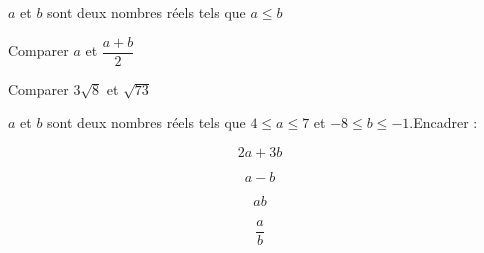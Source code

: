 \documentclass[a4paper,12pt]{article}
\begin{document}
\devoir[prv=true,ds=true,num=2 ,niv=3 , date=15/12/2022 ]
\begin{exo}[3]
$a$ et $b$ sont deux nombres réels tels que $a\leq b$
\begin{enumerate}

\begin{minipage}{.5\linewidth}
\item Comparer $a$ et $\dfrac{a+b}{2}$ 
\end{minipage}%
\begin{minipage}{.5\linewidth}
\item Comparer $3\sqrt{8}$ et $\sqrt{73}$ 
\end{minipage}
\end{enumerate}
\begin{minipage}{.49\linewidth}
\anserline[5]
\end{minipage}
\hfill\vline\hfill
\begin{minipage}{.49\linewidth}
\anserline[5]
\end{minipage}
\end{exo}

\begin{exo}[8]
$a$ et $b$ sont deux nombres réels tels que $4\leq a\leq 7$ et $-8\leq b\leq -1$.Encadrer :

\begin{minipage}{.24\linewidth}
$$2a+3b$$
\end{minipage}
\begin{minipage}{.24\linewidth}
$$a-b$$
\end{minipage}
\begin{minipage}{.24\linewidth}
$$ab$$ 
\end{minipage}
\begin{minipage}{.24\linewidth}
$$\dfrac{a}{b}$$ 
\end{minipage}%

\begin{minipage}{0.24\linewidth}
\anserline[14]
\end{minipage}
\hfill\vline\hfill
\begin{minipage}{0.24\linewidth}
\anserline[14]
\end{minipage}
\hfill\vline\hfill
\begin{minipage}{0.24\linewidth}
\anserline[14]
\end{minipage}
\hfill\vline\hfill
\begin{minipage}{0.24\linewidth}
\anserline[14]
\end{minipage}
\end{exo}
\end{document}
